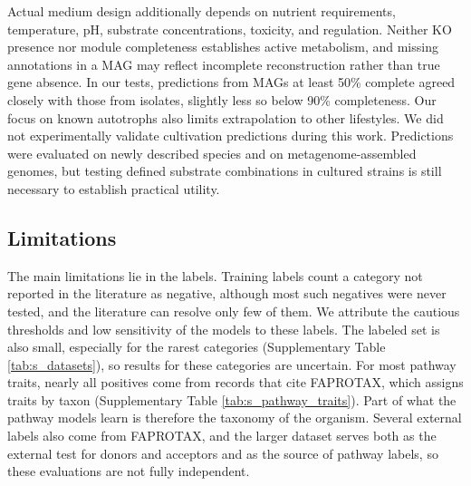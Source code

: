 \documentclass[10pt,a4paper,onecolumn]{article}
\begin{document}
Actual medium design additionally depends on nutrient requirements,
temperature, pH, substrate concentrations, toxicity, and regulation.
Neither KO presence nor module completeness establishes active
metabolism, and missing annotations in a MAG may reflect incomplete
reconstruction rather than true gene absence. In our tests, predictions
from MAGs at least 50\% complete agreed closely with those from
isolates, slightly less so below 90\% completeness. Our focus on known
autotrophs also limits extrapolation to other lifestyles. We did not
experimentally validate cultivation predictions during this work.
Predictions were evaluated on newly described species and on
metagenome-assembled genomes, but testing defined substrate combinations
in cultured strains is still necessary to establish practical utility.

\subsection{Limitations}\label{limitations}

The main limitations lie in the labels. Training labels count a category
not reported in the literature as negative, although most such negatives
were never tested, and the literature can resolve only few of them. We
attribute the cautious thresholds and low sensitivity of the models to
these labels. The labeled set is also small, especially for the rarest
categories (Supplementary Table \ref{tab:s_datasets}), so results for
these categories are uncertain. For most pathway traits, nearly all
positives come from records that cite FAPROTAX, which assigns traits by
taxon (Supplementary Table \ref{tab:s_pathway_traits}). Part of what the
pathway models learn is therefore the taxonomy of the organism. Several
external labels also come from FAPROTAX, and the larger dataset serves
both as the external test for donors and acceptors and as the source of
pathway labels, so these evaluations are not fully independent.
\end{document}

